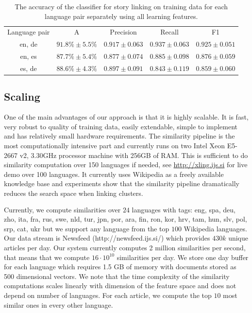 \documentclass[twoside,11pt]{article}
\begin{document}
\begin{table}[h]
\caption{The accuracy of the classifier for story linking on training data for each language pair separately using all learning features.}
\label{table:langPairEval}
\begin{center}
\begin{tabular}{|c|c|c|c|c|}
  \hline
  \cline{1-5}
  Language pair & A & Precision & Recall & F1 \\ \cline{1-5}
  en, de & $91.8\% \pm 5.5\%$ & $0.917 \pm 0.063$ & $0.937 \pm 0.063$ & $0.925 \pm 0.051$ \\ \cline{1-5}
  en, es & $87.7\% \pm 5.4\%$ & $0.877 \pm 0.074$ & $0.885 \pm 0.098$ & $0.876 \pm 0.059$ \\ \cline{1-5}
  es, de & $88.6\% \pm 4.3\%$ & $0.897 \pm 0.091$ & $0.843 \pm 0.119$ & $0.859 \pm 0.060$ \\ \cline{1-5}
  \hline
\end{tabular}
\end{center}
\end{table}

\subsection{Scaling}
One of the main advantages of our approach is that it is highly scalable. It is fast, very robust to quality of training data, easily extendable, simple to implement and has relatively small hardware requirements. The similarity pipeline is the most computationally intensive part and currently runs on two Intel Xeon E5-2667 v2, 3.30GHz processor machine with 256GB of RAM. This is sufficient to do similarity computation over 150 languages if needed, see \url{http://xling.ijs.si} for live demo over 100 languages. It currently uses Wikipedia as a freely available knowledge base and experiments show that the similarity pipeline dramatically reduces the search space when linking clusters.

Currently, we compute similarities over $24$ languages with tags: eng, spa, deu, zho, ita, fra, rus, swe, nld, tur, jpn, por, ara, fin, ron, kor, hrv, tam, hun, slv, pol, srp, cat, ukr but we support any language from the top $100$ Wikipedia languages. Our data stream is Newsfeed (http://newsfeed.ijs.si/) which provides $430k$ unique articles per day. Our system currently computes 2 million similarities per second, that means that we compute $16 \cdot 10^{10}$ similarities per day. We
store one day buffer for each language which requires 1.5 GB of memory with documents   stored as 500 dimensional vectors. We  note that the time complexity of the similarity computations scales linearly with dimension of the feature space and does not  depend on number of languages. For each article, we compute the top $10$  most similar ones in every other language.
\end{document}
